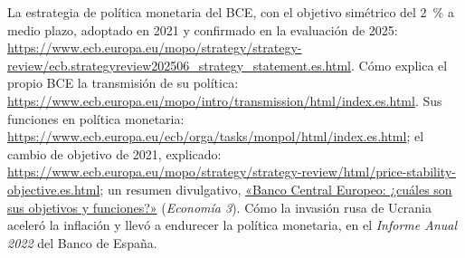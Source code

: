 \documentclass[11pt]{article}
\begin{document}
\begin{anotaciones}
La estrategia de política monetaria del BCE, con el objetivo simétrico del 2~\% a medio plazo, adoptado en 2021 y confirmado en la evaluación de 2025\nocite{BCE2021Estrategia,BCE2025Estrategia}: \url{https://www.ecb.europa.eu/mopo/strategy/strategy-review/ecb.strategyreview202506_strategy_statement.es.html}. Cómo explica el propio BCE la transmisión de su política: \url{https://www.ecb.europa.eu/mopo/intro/transmission/html/index.es.html}. Sus funciones en política monetaria: \url{https://www.ecb.europa.eu/ecb/orga/tasks/monpol/html/index.es.html}; el cambio de objetivo de 2021, explicado: \url{https://www.ecb.europa.eu/mopo/strategy/strategy-review/html/price-stability-objective.es.html}; un resumen divulgativo, \href{https://economia3.com/banco-central-europeo/}{«Banco Central Europeo: ¿cuáles son sus objetivos y funciones?»} (\emph{Economía 3}). Cómo la invasión rusa de Ucrania aceleró la inflación y llevó a endurecer la política monetaria, en el \emph{Informe Anual 2022} del Banco de España\nocite{BdE2023InformeAnual2022}.
\end{anotaciones}
\end{document}
